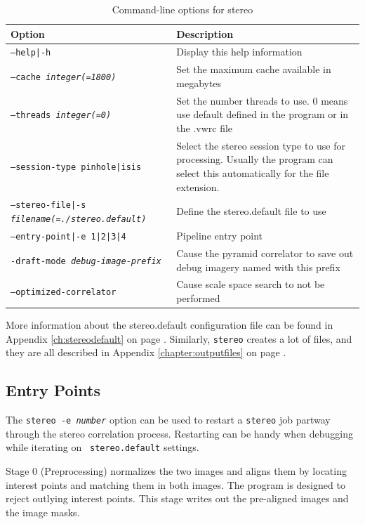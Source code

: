 \begin{longtable}{|l|p{7.5cm}|}
\caption{Command-line options for stereo}
\label{tbl:stereo}
\endfirsthead
\endhead
\endfoot
\endlastfoot
\hline
Option & Description \\ \hline \hline
\texttt{--help|-h} & Display this help information\\ \hline
\texttt{--cache \textit{integer(=1800)}} & Set the maximum cache available in megabytes\\ \hline
\texttt{--threads \textit{integer(=0)}} & Set the number threads to use. 0 means use default defined in the program or in the .vwrc file\\ \hline
\texttt{--session-type pinhole|isis} & Select the stereo session type to use for processing. Usually the program can select this automatically for the file extension.\\ \hline
\texttt{--stereo-file|-s \textit{filename(=./stereo.default)}} & Define the stereo.default file to use\\ \hline
\texttt{--entry-point|-e 1|2|3|4} & Pipeline entry point \\ \hline
\texttt{-draft-mode \textit{debug-image-prefix}} & Cause the pyramid correlator to save out debug imagery named with this prefix\\ \hline
\texttt{--optimized-correlator} & Cause scale space search to not be performed\\ \hline
\end{longtable}

More information about the stereo.default configuration file can be found in Appendix \ref{ch:stereodefault} on page \pageref{ch:stereodefault}.  Similarly, \texttt{stereo} creates a lot of files, and they are all described in Appendix \ref{chapter:outputfiles} on page \pageref{chapter:outputfiles}.

\subsection{Entry Points}
\label{entrypoints}

The \texttt{stereo -e \textit{number}} option can be used to restart
a {\tt stereo} job partway through the stereo correlation process.
Restarting can be handy when debugging while iterating on {\tt
stereo.default} settings.

Stage 0 (Preprocessing) normalizes the two images and aligns them
by locating interest points and matching them in both images. The
program is designed to reject outlying interest points.  This stage
writes out the pre-aligned images and the image masks.

